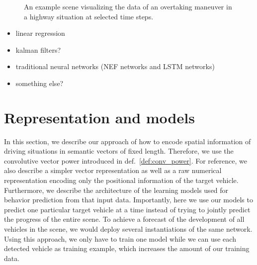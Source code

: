 \begin{figure}[H]
{	}
	\vspace{-0.3cm}
	\caption{An example scene visualizing the data of an overtaking maneuver in a highway situation at selected time steps.} \label{fig:overtaking}
\end{figure}

\begin{itemize}
	\item linear regression
	\item kalman filters?
	\item traditional neural networks (\ac{NEF} networks and \ac{LSTM} networks)
	\item something else?
\end{itemize}

\section{Representation and models}
\label{sec:repr_models}

In this section, we describe our approach of how to encode spatial information of driving situations in semantic vectors of fixed length.
Therefore, we use the convolutive vector power introduced in def.~\ref{def:conv_power}.
For reference, we also describe a simpler vector representation as well as a raw numerical representation encoding only the positional information of the target vehicle.  
Furthermore, we describe the architecture of the learning models used for behavior prediction from that input data.
Importantly, here we use our models to predict one particular target vehicle at a time instead of trying to jointly predict the progress of the entire scene.
To achieve a forecast of the development of all vehicles in the scene, we would deploy several instantiations of the same network.
Using this approach, we only have to train one model while we can use each detected vehicle as training example, which increases the amount of our training data. 


